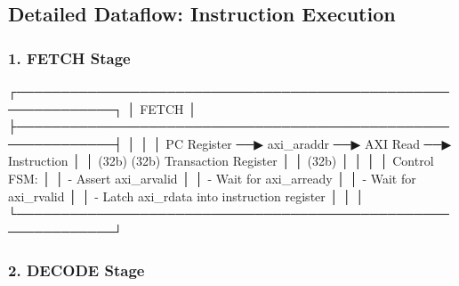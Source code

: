 \subsection{Detailed Dataflow: Instruction Execution}\label{cr:fix:cpu-dataflow-diagram:detailed-dataflow-instruction-execution}

\subsubsection{1. FETCH Stage}\label{cr:fix:cpu-dataflow-diagram:1-fetch-stage}

\begin{record}

\begin{textblock}
┌─────────────────────────────────────────────────────────────┐
│                        FETCH                                │
├─────────────────────────────────────────────────────────────┤
│                                                             │
│  PC Register ──▶ axi_araddr ──▶ AXI Read ──▶ Instruction   │
│     (32b)           (32b)        Transaction    Register    │
│                                                    (32b)     │
│                                                             │
│  Control FSM:                                               │
│  - Assert axi_arvalid                                       │
│  - Wait for axi_arready                                     │
│  - Wait for axi_rvalid                                      │
│  - Latch axi_rdata into instruction register                │
│                                                             │
└─────────────────────────────────────────────────────────────┘
\end{textblock}

\end{record}

\subsubsection{2. DECODE Stage}\label{cr:fix:cpu-dataflow-diagram:2-decode-stage}

